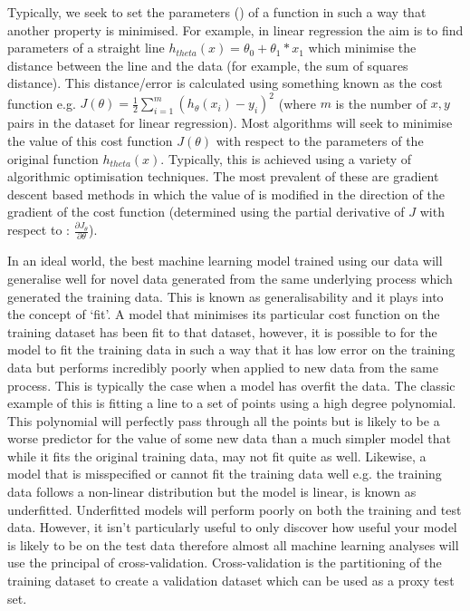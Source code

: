 Typically, we seek to set the parameters (\theta) of a function in such a way
that another property is minimised.  For example, in linear regression the aim is to find 
parameters of a straight line \(h_{theta}(x) = \theta_{0} + \theta_{1} * x_{1}\) which minimise the distance
between the line and the data (for example, the sum of squares distance).
This distance/error is calculated using something known as the cost function e.g. \(J(\theta) = \frac{1}{2} \sum^{m}_{i=1} (h_{\theta}(x_{i}) - y_{i})^2\) 
(where \(m\) is the number of \(x, y\) pairs in the dataset for linear regression).
Most algorithms will seek to minimise the value of this cost function \(J(\theta)\) with respect to 
the parameters of the original function \(h_{theta}(x)\).  Typically, this is achieved using a variety of algorithmic optimisation techniques.
The most prevalent of these are gradient descent based methods in which the value of \theta is modified 
in the direction of the gradient of the cost function (determined using the partial derivative of \(J\) with respect to \theta: \(\frac{\partial J_{\theta}}{\partial\theta}\)).  


In an ideal world, the best machine learning model trained using our data will generalise well for novel data generated from the same underlying process
which generated the training data.  This is known as generalisability and it plays into the concept of `fit'.  A model that minimises 
its particular cost function on the training dataset has been fit to that dataset, however, it is possible to for the model to fit the training
data in such a way that it has low error on the training data but performs incredibly poorly when applied to new data from the same process.
This is typically the case when a model has overfit the data.  The classic example of this is fitting a line to a set of points using a
high degree polynomial.  This polynomial will perfectly pass through all the points but is likely to be a worse predictor for the value 
of some new data than a much simpler model that while it fits the original training data, may not fit quite as well.  Likewise, a model that is misspecified
or cannot fit the training data well e.g. the training data follows a non-linear distribution but the model is linear, is known as underfitted.
Underfitted models will perform poorly on both the training and test data.  However, it isn't particularly useful to only discover
how useful your model is likely to be on the test data therefore almost all machine learning analyses will use the principal of cross-validation.
Cross-validation is the partitioning of the training dataset to create a validation dataset which can be used as a proxy test set.

